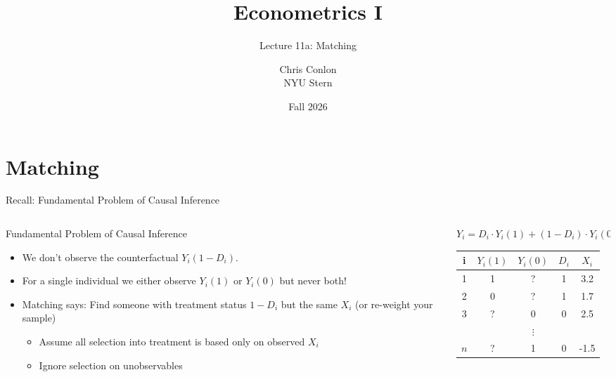 \documentclass[aspectratio=169,11pt]{beamer}
\title[L11a - Matching]{ Econometrics I}
\subtitle{Lecture 11a: Matching}
\author{Chris Conlon \\NYU Stern}
\date{Fall 2026}
\begin{document}
\frame{\titlepage}

\section{Matching}


\begin{frame}{Recall: Fundamental Problem of Causal Inference}
\begin{columns}[T] %
\begin{column}{.65\textwidth}
Fundamental Problem of Causal Inference
\begin{itemize}
\item We don't observe the \alert{counterfactual} $Y_i(1-D_i)$.
\item For a single individual we either observe $Y_i(1)$ \alert{or} $Y_i(0)$ but never both!
\item Matching says: Find someone with treatment status $1-D_i$ but the same $X_i$ (or \alert{re-weight} your sample)
\begin{itemize}
	\item Assume all selection into treatment is based only on observed $X_i$
	\item Ignore \alert{selection on unobservables}
\end{itemize}
\end{itemize}
\end{column}%
\hfill%
\begin{column}{.33\textwidth}

  \vspace{20pt}
  
  $Y_{i} = D_{i}\cdot Y_{i}(1) + (1-D_{i}) \cdot Y_{i}(0)$\\
  \vspace{20pt}
  \begin{tabular}{ccccc}
    \toprule
    i & $Y_{i}(1)$ &  $Y_{i}(0)$ & $D_{i}$ & $X_{i}$ \\
    \midrule
    1 &     1      &     \alert{?}      &   1   & 3.2 \\
    2 &     0      &     \alert{?}      &   1   & 1.7 \\
    3 &     \alert{?}      &     0      &   0   & 2.5 \\
     & &  $\vdots$ & & \\
    $n$ &     \alert{?}      &     1      &   0   & -1.5 \\    
    \bottomrule
  \end{tabular}
\end{column}%
\end{columns}
\end{frame}
\end{document}
